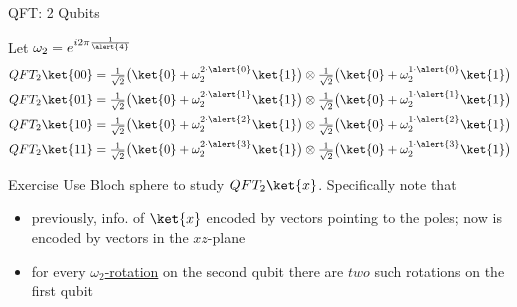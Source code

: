 \documentclass{beamer}
\begin{document}
\begin{frame}{QFT: 2 Qubits}

        Let $\omega_2 = e^{i 2 \pi \frac{1}{\alert{4}}}$
        \begin{align*}
                QFT_2 \ket{00} & = \textstyle{\frac{1}{\sqrt{2}} \big (\ket{0} 
                + \omega_2^{2 \cdot \alert{0}} \ket{1} \big )}  \otimes  
                \textstyle{\frac{1}{\sqrt{2}} \big (\ket{0} 
                + \omega_2^{1 \cdot \alert{0}} \ket{1} \big )}   \\
                QFT_2 \ket{01} & = \textstyle{\frac{1}{\sqrt{2}} \big (\ket{0} 
                + \omega_2^{2 \cdot \alert{1}} \ket{1} \big )}   \otimes
                \textstyle{\frac{1}{\sqrt{2}} \big (\ket{0} 
                + \omega_2^{1 \cdot \alert{1}} \ket{1} \big )}  \\
                QFT_2 \ket{10} & = \textstyle{\frac{1}{\sqrt{2}} \big (\ket{0} 
                + \omega_2^{2 \cdot \alert{2}} \ket{1} \big )}   \otimes
                \textstyle{\frac{1}{\sqrt{2}} \big (\ket{0} 
                + \omega_2^{1 \cdot \alert{2}} \ket{1} \big )}  \\
                QFT_2 \ket{11} & = \textstyle{\frac{1}{\sqrt{2}} \big (\ket{0} 
                + \omega_2^{2 \cdot \alert{3}} \ket{1} \big )}   \otimes
                \textstyle{\frac{1}{\sqrt{2}} \big (\ket{0} 
                + \omega_2^{1 \cdot \alert{3}} \ket{1} \big )} 
        \end{align*}

        \pause
        \begin{block}{Exercise}
        Use Bloch sphere to study $QFT_2 \ket{x}$. Specifically note that 
        \begin{itemize}
               \item previously, info. of $\ket{x}$ encoded by vectors
                       pointing to the poles; 
                       now is encoded by vectors in the \alert{$xz$-plane}
               \item for every \alert{\underline{$\omega_2$-rotation}} on the second
                       qubit there are \alert{$two$} such rotations on the first
                       qubit
        \end{itemize}
        \end{block}

\end{frame}
\end{document}
